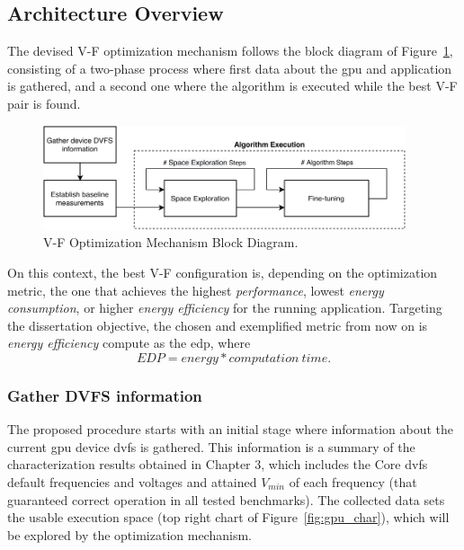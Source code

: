 \subsection{Architecture Overview}


The devised V-F optimization mechanism follows the block diagram of Figure~\ref{fig:opt_mech}, consisting of a two-phase process where first data about the \acrshort{gpu} and application is gathered, and a second one where the algorithm is executed while the best V-F pair is found. 

\begin{figure}[htb]
  \centering
  \includegraphics[width=0.95\textwidth]{Figures/Optimization/full_mech_5.pdf}
  \caption{V-F Optimization Mechanism Block Diagram.}
  \label{fig:opt_mech}
\end{figure}

On this context, the best V-F configuration is, depending on the optimization metric, the one that achieves the highest \textit{performance}, lowest \textit{energy consumption}, or higher \textit{energy efficiency} for the running application. Targeting the dissertation objective, the chosen and exemplified metric from now on is \textit{energy efficiency} compute as the \acrshort{edp}, where 
\begin{equation}
	EDP=energy * computation \: time.
	\label{eq:edp}
\end{equation}

\subsubsection{Gather DVFS information}

The proposed procedure starts with an initial stage where information about the current \acrshort{gpu} device \acrshort{dvfs} is gathered. This information is a summary of the characterization results obtained in Chapter 3, which includes the Core \acrshort{dvfs} default frequencies and voltages and attained $V_{min}$ of each frequency (that guaranteed correct operation in all tested benchmarks). The collected data sets the usable execution space (top right chart of Figure~\ref{fig:gpu_char}), which will be explored by the optimization mechanism.

